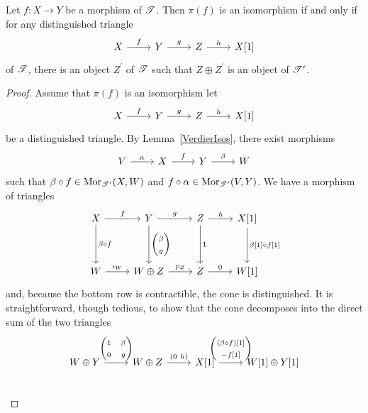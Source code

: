 \documentclass[dissertation.tex]{subfiles}
\begin{document}
\begin{prop}\label{VerdierIsomorphism}
  Let $f \colon X \rightarrow Y$ be a morphism of $\mathscr{T}$.
  Then $\pi(f)$ is an isomorphism if and only if for any distinguished triangle
  $$\begin{tikzcd}
    X \arrow{r}{f} & Y \arrow{r}{g} & Z \arrow{r}{h} & X[1]
  \end{tikzcd}$$
  of $\mathscr{T}$, there is an object $Z^\prime$ of $\mathscr{T}$ such that $Z \oplus Z^\prime$ is an object of $\mathscr{T}^\prime$.

  \begin{proof}
    Assume that $\pi(f)$ is an isomorphism let
    $$\begin{tikzcd}
      X \arrow{r}{f} & Y \arrow{r}{g} & Z \arrow{r}{h} & X[1]
    \end{tikzcd}$$
    be a distinguished triangle.
    By Lemma~\ref{VerdierIsos}, there exist morphisms
    $$\begin{tikzcd}
      V \arrow{r}{\alpha} & X \arrow{r}{f} & Y \arrow{r}{\beta} & W
    \end{tikzcd}$$
    such that $\beta \circ f \in \Mor{\T^\prime}(X,W)$ and $f \circ \alpha \in \Mor{\T^\prime}(V,Y)$.
    We have a morphism of triangles
    $$\begin{tikzcd}
      X \arrow{r}{f}\arrow{dd}{\beta \circ f} & Y \arrow{r}{g}\arrow{dd}{\left(\begin{matrix}\beta\\ g\end{matrix}\right)} & Z \arrow{r}{h}\arrow{dd}{1} & X[1]\arrow{dd}{\beta[1] \circ f[1]}\\
      \\
      W \arrow{r}{\imath_W} & W \oplus Z \arrow{r}{p_Z} & Z \arrow{r}{0} & W[1]
    \end{tikzcd}$$
    and, because the bottom row is contractible, the cone is distinguished.
    It is straightforward, though tedious, to show that the cone decomposes into the direct sum of the two triangles
    $$\begin{tikzcd}[ampersand replacement=\&]
      W \oplus Y \arrow{r}{\left(\begin{matrix}1 & \beta\\0 & g\end{matrix}\right)} \& W \oplus Z \arrow{r}{\left(0\ h\right)} \& X[1] \arrow{r}{\left(\begin{matrix}(\beta \circ f)[1]\\-f[1]\end{matrix}\right)} \& W[1] \oplus Y[1]\\

\end{tikzcd}$$
\end{proof}
\end{prop}
\end{document}
